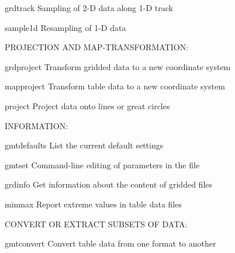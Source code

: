 \documentclass{article}
\begin{document}
\par 	grdtrack	Sampling of 2-D data along 1-D track\par 

\par 	sample1d	Resampling of 1-D data\par 

\par \par 

\par PROJECTION AND MAP-TRANSFORMATION:\par 

\par 	grdproject	Transform gridded data to a new coordinate system\par 

\par 	mapproject	Transform table data to a new coordinate system\par 

\par 	project	Project data onto lines or great circles\par 

\par \par 

\par INFORMATION:\par 

\par 	gmtdefaults	List the current default settings\par 

\par 	gmtset	Command-line editing of parameters in the  file\par 

\par 	grdinfo	Get information about the content of gridded files\par 

\par 	minmax	Report extreme values in table data files\par 

\par \par 

\par CONVERT OR EXTRACT SUBSETS OF DATA:\par 

\par 	gmtconvert	Convert table data from one format to another\par 
\end{document}
